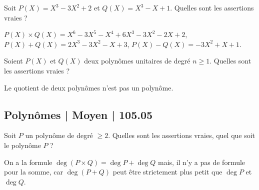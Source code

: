 \begin{question}
Soit $P(X) = X^3-3X^2+2$ et $Q(X) = X^3-X+1$.
Quelles sont les assertions vraies ?
\begin{answers}


    
\end{answers}
\begin{explanations}
$P(X)\times Q(X) = X^6 - 3 X^5 - X^4 + 6 X^3 - 3 X^2 - 2 X + 2$, 
$P(X) + Q(X) = 2 X^3 - 3 X^2 - X + 3$,
$P(X) - Q(X) = -3 X^2 + X + 1$.
\end{explanations}
\end{question}


\begin{question}
Soient $P(X)$ et $Q(X)$ deux polynômes unitaires de degré $n\ge1$.
Quelles sont les assertions vraies ?
\begin{answers}

    

\end{answers}
\begin{explanations}
Le quotient de deux polynômes n'est pas un polynôme.
\end{explanations}
\end{question}


\subsection{Polynômes | Moyen | 105.05}


\begin{question}
Soit $P$ un polynôme de degré $\ge 2$.
Quelles sont les assertions vraies, quel que soit le polynôme $P$ ?
\begin{answers}



\end{answers}
\begin{explanations}
On a la formule $\deg(P\times Q) = \deg P + \deg Q$ mais, il n'y a pas de formule pour la somme, car $\deg(P + Q)$ peut être strictement plus petit que $\deg P$ et $\deg Q$.
\end{explanations}
\end{question}


